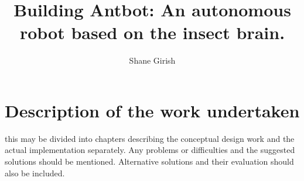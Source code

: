 \documentclass[msc, cs]{infthesis}
\title{Building Antbot: An autonomous robot based on the insect brain.}
\author{Shane Girish}
\begin{document}
  \begin{preliminary}
    \maketitle
    \standarddeclaration
    \tableofcontents
  \end{preliminary}

  
  
  
  \chapter{Description of the work undertaken}
    this may be divided into chapters describing the conceptual design work and the actual implementation separately. Any problems or difficulties and the suggested solutions should be mentioned. Alternative solutions and their evaluation should also be included.
  
  
  
  
  \appendix
  
  
    \nocite{*}
    
\end{document}
